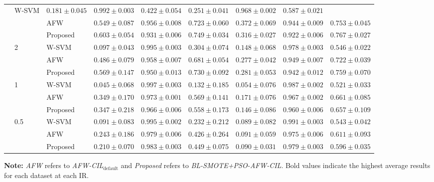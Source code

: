 \documentclass[pdflatex,sn-mathphys-num]{sn-jnl}%
\theoremstyle{thmstyleone}%
\theoremstyle{thmstyletwo}
\theoremstyle{thmstylethree}
\begin{document}
\begin{table}[htbp]
{\begin{tabular}{lllcccccc}
& W-SVM     & $0.181 \pm 0.045$ & $\mathbf{0.992 \pm 0.003}$ & $0.422 \pm 0.054$ & $0.251 \pm 0.041$ & $\mathbf{0.968 \pm 0.002}$ & $0.587 \pm 0.021$ \\
& & AFW     & $0.549 \pm 0.087$ & $0.956 \pm 0.008$ & $0.723 \pm 0.060$ & $\mathbf{0.372 \pm 0.069}$ & $0.944 \pm 0.009$ & $0.753 \pm 0.045$ \\
& & Proposed& $\mathbf{0.603 \pm 0.054}$ & $0.931 \pm 0.006$ & $\mathbf{0.749 \pm 0.034}$ & $0.316 \pm 0.027$ & $0.922 \pm 0.006$ & $\mathbf{0.767 \pm 0.027}$ \\
\cmidrule{2-9}
& \multirow{3}{*}{2}
& W-SVM     & $0.097 \pm 0.043$ & $\mathbf{0.995 \pm 0.003}$ & $0.304 \pm 0.074$ & $0.148 \pm 0.068$ & $\mathbf{0.978 \pm 0.003}$ & $0.546 \pm 0.022$ \\
& & AFW     & $0.486 \pm 0.079$ & $0.958 \pm 0.007$ & $0.681 \pm 0.054$ & $0.277 \pm 0.042$ & $0.949 \pm 0.007$ & $0.722 \pm 0.039$ \\
& & Proposed& $\mathbf{0.569 \pm 0.147}$ & $0.950 \pm 0.013$ & $\mathbf{0.730 \pm 0.092}$ & $\mathbf{0.281 \pm 0.053}$ & $0.942 \pm 0.012$ & $\mathbf{0.759 \pm 0.070}$ \\
\cmidrule{2-9}
& \multirow{3}{*}{1}
& W-SVM     & $0.045 \pm 0.068$ & $\mathbf{0.997 \pm 0.003}$ & $0.132 \pm 0.185$ & $0.054 \pm 0.076$ & $\mathbf{0.987 \pm 0.002}$ & $0.521 \pm 0.033$ \\
& & AFW     & $\mathbf{0.349 \pm 0.170}$ & $0.973 \pm 0.001$ & $\mathbf{0.569 \pm 0.141}$ & $\mathbf{0.171 \pm 0.076}$ & $0.967 \pm 0.002$ & $\mathbf{0.661 \pm 0.085}$ \\
& & Proposed& $0.347 \pm 0.218$ & $0.966 \pm 0.006$ & $0.558 \pm 0.173$ & $0.146 \pm 0.086$ & $0.960 \pm 0.006$ & $0.657 \pm 0.109$ \\
\cmidrule{2-9}
& \multirow{3}{*}{0.5}
& W-SVM     & $0.091 \pm 0.083$ & $\mathbf{0.995 \pm 0.002}$ & $0.232 \pm 0.212$ & $0.089 \pm 0.082$ & $\mathbf{0.991 \pm 0.003}$ & $0.543 \pm 0.042$ \\
& & AFW     & $\mathbf{0.243 \pm 0.186}$ & $0.979 \pm 0.006$ & $0.426 \pm 0.264$ & $\mathbf{0.091 \pm 0.059}$ & $0.975 \pm 0.006$ & $\mathbf{0.611 \pm 0.093}$ \\
& & Proposed& $0.210 \pm 0.070$ & $0.983 \pm 0.003$ & $\mathbf{0.449 \pm 0.075}$ & $0.090 \pm 0.031$ & $0.979 \pm 0.003$ & $0.596 \pm 0.035$ \\
\bottomrule
\end{tabular}
}

\smallskip
\noindent \footnotesize \textbf{Note:} \textit{AFW} refers to \textit{AFW-CIL$_{\mathrm{default}}$} and \textit{Proposed} refers to \textit{BL-SMOTE+PSO-AFW-CIL}. Bold values indicate the highest average results for each dataset at each IR.
\end{table}
\end{document}
